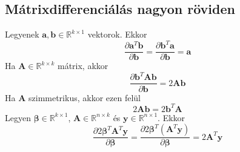 \documentclass[14p]{report}
\def\pmb{\boldsymbol}
\begin{document}
\subsection{Mátrixdifferenciálás nagyon röviden}
Legyenek $\pmb{a}, \pmb{b} \in \mathbb{R}^{k \times 1}$ vektorok. Ekkor
\[
	\frac{\partial\pmb{a}^T\pmb{b}}{\partial\pmb{b}} = \frac{\partial\pmb{b}^T\pmb{a}}{\partial\pmb{b}} = \pmb{a}
\]
Ha $\pmb{A} \in \mathbb{R}^{k \times k}$ mátrix, akkor
\[
	\frac{\partial\pmb{b}^T\pmb{A}\pmb{b}}{\partial\pmb{b}} = 2\pmb{A}\pmb{b}
\]
Ha $\pmb{A}$ szimmetrikus, akkor ezen felül
\[
	2\pmb{A}\pmb{b} = 2\pmb{b}^T\pmb{A}
\]
Legyen $\pmb{\beta} \in \mathbb{R}^{k \times 1}$, $\pmb{A} \in \mathbb{R}^{n \times k}$ és $\pmb{y} \in \mathbb{R}^{n \times 1}$. Ekkor
\[
	\frac{\partial 2\pmb{\beta}^T\pmb{A}^T\pmb{y}}{\partial\pmb{\beta}} = \frac{\partial 2\pmb{\beta}^T(\pmb{A}^T\pmb{y})}{\partial\pmb{\beta}} = 2\pmb{A}^T\pmb{y}
\]
\end{document}

